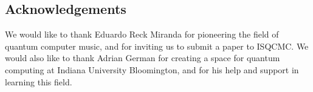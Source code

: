 \documentclass[10pt,twocolumn]{article}
\begin{document}
\subsection{Acknowledgements}

We would like to thank Eduardo Reck Miranda for pioneering the field of quantum computer music, and for inviting us to submit a paper to ISQCMC. We would also like to thank Adrian German for creating a space for quantum computing at Indiana University Bloomington, and for his help and support in learning this field.







\end{document}
